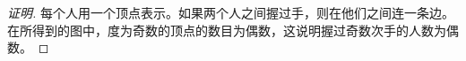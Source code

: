 \begin{proof}[证明]
  每个人用一个顶点表示。如果两个人之间握过手，则在他们之间连一条边。在所得到的图中，度为奇数的顶点的数目为偶数，这说明握过奇数次手的人数为偶数。
\end{proof}